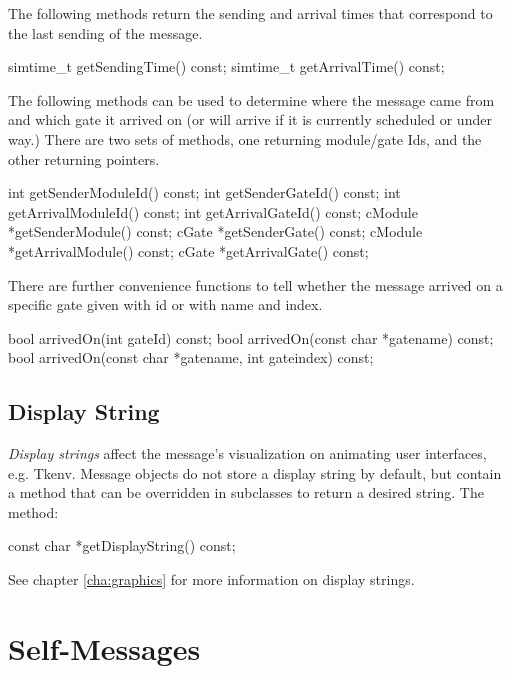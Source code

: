 The following methods return the sending and arrival times that correspond
to the last sending of the message.

\begin{cpp}
simtime_t getSendingTime() const;
simtime_t getArrivalTime() const;
\end{cpp}

The following methods can be used to determine where the message came from
and which gate it arrived on (or will arrive if it is currently scheduled
or under way.) There are two sets of methods, one returning module/gate Ids,
and the other returning pointers.

\begin{cpp}
int getSenderModuleId() const;
int getSenderGateId() const;
int getArrivalModuleId() const;
int getArrivalGateId() const;
cModule *getSenderModule() const;
cGate *getSenderGate() const;
cModule *getArrivalModule() const;
cGate *getArrivalGate() const;
\end{cpp}

There are further convenience functions to tell whether
the message arrived on a specific gate given with id or
with name and index.

\begin{cpp}
bool arrivedOn(int gateId) const;
bool arrivedOn(const char *gatename) const;
bool arrivedOn(const char *gatename, int gateindex) const;
\end{cpp}


\subsection{Display String}

\textit{Display strings} affect the message's visualization on animating user interfaces, e.g. Tkenv.
Message objects do not store a display string by default, but contain a 
method that can be overridden in subclasses to return a desired string.  The method:

\begin{cpp}
const char *getDisplayString() const;
\end{cpp}

See chapter \ref{cha:graphics} for more information on display strings.



\section{Self-Messages}
\label{sec:ch-msgs:self-messages}

